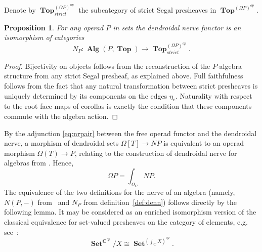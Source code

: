 \documentclass{amsart}
\newtheorem{proposition}[formula]{Proposition}
\theoremstyle{definition}
\theoremstyle{remark}
\DeclareMathOperator{\Top}{\mathbf{Top}}
\DeclareMathOperator{\Set}{\mathbf{Set}}
\DeclareMathOperator{\Alg}{\mathbf{Alg}}
\begin{document}
	Denote by $\Top^{(\Omega P)^{op}}_{strict}$ the subcategory of strict Segal presheaves in $\Top^{(\Omega P)^{op}}$.
	
	\begin{proposition}\label{pr:dalg}
		For any operad $P$ in sets the dendroidal nerve functor is an isomorphism of categories
		\[
			N_{P}\colon \Alg(P,\Top)\to \Top^{(\Omega P)^{op}}_{strict}.
		\]
	\end{proposition}
	\begin{proof}
		Bijectivity on objects follows from the reconstruction of the $P$-algebra structure from any strict Segal presheaf, as explained above. 
		Full faithfulness follows from the fact that any natural transformation between strict presheaves is uniquely determined by its components on the edges $\eta_c$. Naturality with respect to the root face maps of corollas is exactly the condition that these components commute with the algebra action.
	\end{proof}

	By the adjunction \eqref{eq:nrpair} between the free operad functor and the dendroidal nerve, a morphism of dendroidal sets $\Omega[T] \to NP$ is equivalent to an operad morphism $\Omega(T)\to P$, relating to the construction of dendroidal nerve for algebras from \cite[\S9.5]{he-mo-22}.
	Hence,
	\[
		\Omega P=\int_{\Omega_{C}} NP.
	\]
	The equivalence of the two definitions for the nerve of an algebra (namely, $N(P,-)$ from~\cite[\S9.5]{he-mo-22} and $N_{P}$ from definition~\ref{def:denn}) follows directly by the following lemma.
	It may be considered as an enriched isomorphism version of the classical equivalence for set-valued presheaves on the category of elements, e.g. see~\cite[exercise~III.8(a)]{ma-mo-92}:
	\[
		\Set^{\mathbf{C}^{op}}/X\cong \Set^{(\int_{\mathbf{C}} X)^{op}}.
	\]
	
\end{document}
